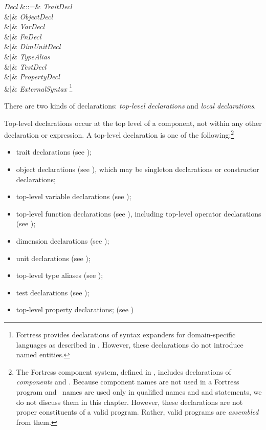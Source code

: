 
\begin{Grammar}
\emph{Decl} &::=& \emph{TraitDecl}\\
&$|$& \emph{ObjectDecl}\\
&$|$& \emph{VarDecl}\\
&$|$& \emph{FnDecl}\\
&$|$& \emph{DimUnitDecl}\\
&$|$& \emph{TypeAlias}\\
&$|$& \emph{TestDecl}\\
&$|$& \emph{PropertyDecl}\\
&$|$& \emph{ExternalSyntax}
\footnote{
Fortress provides declarations of syntax expanders for domain-specific languages
as described in .
 However, these declarations do not introduce named entities.
}\\
\end{Grammar}
There are two kinds of declarations: \emph{top-level declarations} and
\emph{local declarations}.

Top-level declarations occur at the top level of a component,
not within any other declaration or expression.
A top-level declaration is one of the following:\footnote{The
Fortress component system, defined in ,
includes declarations of \emph{components} and \emph{\apisN}.
Because component names are not used in a Fortress program and
\apiN\ names are used only in
qualified names and
 and  statements,
we do not discuss them in this chapter.
However, these declarations are not proper constituents of a valid
program.  Rather, valid programs are \emph{assembled} from them.
}
\begin{itemize}

\item
trait declarations (see );

\item
object declarations (see ),
which may be singleton declarations or constructor declarations;

\item
top-level variable declarations
(see );

\item
top-level function declarations
(see ),
including top-level operator declarations
(see );

\item
dimension declarations (see );

\item
unit declarations (see );

\item
top-level type aliases (see );

\item
test declarations
(see );

\item
top-level property declarations;
(see )

\end{itemize}

